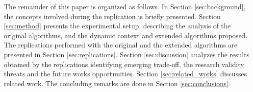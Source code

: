 The remainder of this paper is organized as follows. In Section \ref{sec:background}, the concepts involved during the replication is briefly presented. Section \ref{sec:method} presents the experimental setup, describing the analysis of the original algorithms, and the dynamic context and extended algorithms proposed. The replications performed with the original and the extended algorithms are presented in Section \ref{sec:replications}. Section \ref{sec:discussion} analyzes the results obtained by the replications identifying emerging trade-off, the research validity threats and the future works opportunities. Section \ref{sec:related_works} discusses related work. The concluding remarks are done in Section \ref{sec:conclusions}.